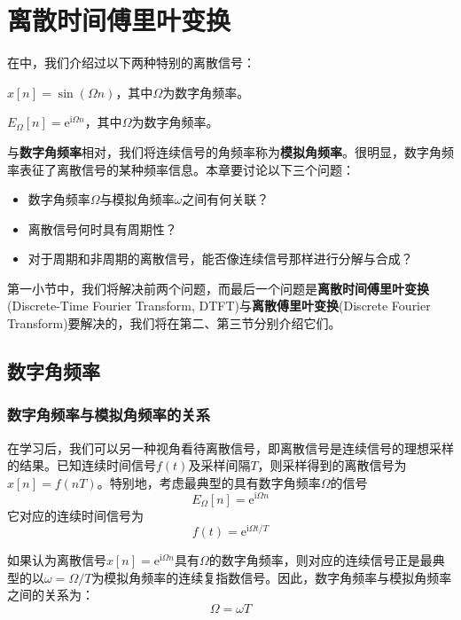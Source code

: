 \section{离散时间傅里叶变换}\label{sec:DTFT}

在中，我们介绍过以下两种特别的离散信号：

\begin{definition}[离散正弦信号]
    $x[n]=\sin(\Omega n)$，其中$\Omega$为数字角频率。
\end{definition}
\begin{definition}[离散复指数信号]
    $E_{\Omega}[n]=\mathrm{e}^{\mathrm{i}\Omega n}$，其中$\Omega$为数字角频率。
\end{definition}

与\textbf{数字角频率}相对，我们将连续信号的角频率称为\textbf{模拟角频率}。很明显，数字角频率表征了离散信号的某种频率信息。本章要讨论以下三个问题：\begin{itemize}
    \item 数字角频率$\Omega$与模拟角频率$\omega$之间有何关联？
    \item 离散信号何时具有周期性？
    \item 对于周期和非周期的离散信号，能否像连续信号那样进行分解与合成？
\end{itemize}

第一小节中，我们将解决前两个问题，而最后一个问题是\textbf{离散时间傅里叶变换}(Discrete-Time Fourier Transform, DTFT)与\textbf{离散傅里叶变换}(Discrete Fourier Transform)要解决的，我们将在第二、第三节分别介绍它们。

\subsection{数字角频率}\label{sub:digital_freq}

\subsubsection{数字角频率与模拟角频率的关系}

在学习后，我们可以另一种视角看待离散信号，即离散信号是连续信号的理想采样的结果。已知连续时间信号$f(t)$及采样间隔$T$，则采样得到的离散信号为$x[n]=f(nT)$。特别地，考虑最典型的具有数字角频率$\Omega$的信号
$$E_{\Omega}[n]=\mathrm{e}^{\mathrm{i}\Omega n}$$
它对应的连续时间信号为
\[f(t)=\mathrm{e}^{\mathrm{i}\Omega t/T}\]

如果认为离散信号$x[n]=\mathrm{e}^{\mathrm{i}\Omega n}$具有$\Omega$的数字角频率，则对应的连续信号正是最典型的以$\omega=\Omega/T$为模拟角频率的连续复指数信号。因此，数字角频率与模拟角频率之间的关系为：
\[\Omega=\omega T\]

